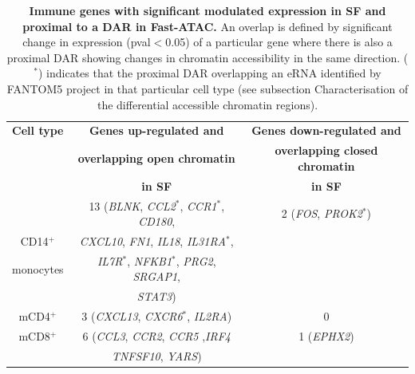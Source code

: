\begin{table}[htbp]
\centering
\begin{tabular}{@{} c c c}
\toprule
\textbf{Cell type} & \textbf{Genes up-regulated and}        &  \textbf{Genes down-regulated and} \\
                   & \textbf{overlapping open chromatin}   &  \textbf{overlapping closed chromatin} \\
									 &	\textbf{in SF}				               &  \textbf{in SF} \\
\midrule
\midrule
          & 13 (\textit{BLNK}, \textit{CCL2$^\ast$}, \textit{CCR1$^\ast$}, \textit{CD180}, & 2 (\textit{FOS}, \textit{PROK2$^\ast$}) \\      CD14$^+$  & \textit{CXCL10}, \textit{FN1}, \textit{IL18}, \textit{IL31RA$^\ast$},    & \\
monocytes & \textit{IL7R$^\ast$}, \textit{NFKB1$^\ast$}, \textit{PRG2}, \textit{SRGAP1}, & \\
				  & \textit{STAT3}) & \\
				
\midrule
mCD4$^+$ & 3 (\textit{CXCL13}, \textit{CXCR6$^\ast$}, \textit{IL2RA}) & 0 \\

\midrule
mCD8$^+$ & 6 (\textit{CCL3}, \textit{CCR2}, \textit{CCR5} ,\textit{IRF4} & 1 (\textit{EPHX2}) \\
         & \textit{TNFSF10}, \textit{YARS}) & \\

\bottomrule
\end{tabular}
\medskip %
\caption[Immune genes with significant modulated expression in SF and proximal to a DAR in Fast-ATAC.]{\textbf{Immune genes with significant modulated expression in SF and proximal to a DAR in Fast-ATAC.} An overlap is defined by significant change in expression (pval$<$0.05) of a particular gene where there is also a proximal DAR showing changes in chromatin accessibility in the same direction. ($^\ast$) indicates that the proximal DAR overlapping an eRNA identified by FANTOM5 project in that particular cell type (see subsection Characterisation of the differential accessible chromatin regions).}
\label{tab:PSA_gene_expression_ATAC_overlap}
\end{table}

